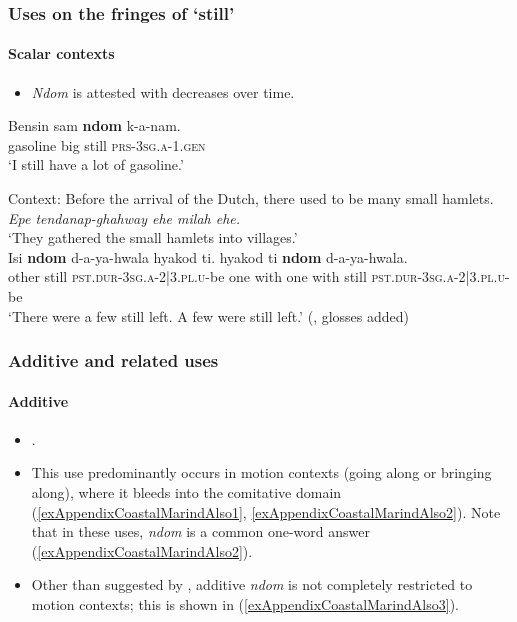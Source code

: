 \subsubsection{Uses on the fringes of \lq{}still\rq{}}
\paragraph{Scalar contexts}\label{appendixCoastalMarindScalar}
\begin{itemize}
	\item \textit{Ndom} is attested with decreases over time.
\end{itemize}

\begin{exe}
	\ex \label{exAppendixCoastalMarindDecrement1}
	\gll Bensin sam \textbf{ndom} k-a-nam.\\
	gasoline big still \textsc{prs}-3\textsc{sg}.\textsc{a}-1.\textsc{gen}\\
	\glt \lq I still have a lot of gasoline.' \parencite[172]{Olsson2017}
	
	\ex Context: Before the arrival of the Dutch, there used to be many small hamlets.\\
	\textit{Epe tendanap-ghahway ehe milah ehe.}
	\\ \lq They gathered the small hamlets into villages.\rq{}
	\\ \gll Isi \textbf{ndom} d-a-ya-hwala hyakod ti. hyakod ti \textbf{ndom} d-a-ya-hwala.\\
other still \textsc{pst}.\textsc{dur}-3\textsc{sg}.\textsc{a}-2|3.\textsc{pl}.\textsc{u}-be one with one with still \textsc{pst}.\textsc{dur}-3\textsc{sg}.\textsc{a}-2|3.\textsc{pl}.\textsc{u}-be\\
\glt \lq There were a few still left. A few were still left.\rq{ }(\cite{Olsson2015}, glosses added)
\end{exe}

\subsubsection{Additive and related uses}
\paragraph{Additive}\label{appendixCoastalMarindAdditive}
\begin{itemize}
	\item \textcite[115, 525–526]{Olsson2017}.
	\item This use predominantly occurs in motion contexts (going along or bringing along), where it bleeds into the comitative domain (\ref{exAppendixCoastalMarindAlso1}, \ref{exAppendixCoastalMarindAlso2}). Note that in these uses, \textit{ndom} is a common one-word answer (\ref{exAppendixCoastalMarindAlso2}).
	\item Other than suggested by \textcite[525]{Olsson2017}, additive \textit{ndom} is not completely restricted to motion contexts; this is shown in (\ref{exAppendixCoastalMarindAlso3}).
\end{itemize}


